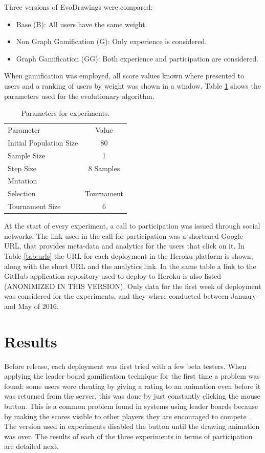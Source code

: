 Three versions of EvoDrawings were compared:
\begin{itemize}
\item Base (B): All users have the same weight.
\item Non Graph Gamification (G): Only experience is considered.
\item Graph Gamification (GG): Both experience and participation are considered.
\end{itemize}
When gamification was employed, all score values known where presented to users
and a ranking of users by weight was shown in a window. Table \ref{tab:params} shows 
the parameters used for the evolutionary algorithm. 

\begin{table}
  \small
  \caption{ Parameters for experiments.  }
  \label{tab:params} 
  \centering
  \small
  \begin{tabular}{l  c}
    \hline\noalign{\smallskip}
     Parameter & Value \\
    \noalign{\smallskip}\hline\noalign{\smallskip}
    Initial Population Size   & 80 \\ \hline
    Sample Size & 1 \\ \hline
    Step Size & 8 Samples \\ \hline
    Mutation &  \\ \hline
    Selection & Tournament \\ \hline
    Tournament Size &  6 \\ \hline
  \end{tabular}
\end{table}

At the start of every experiment, a call to participation was issued
through social networks.  The link used in the call for participation
was a shortened Google URL, that provides meta-data and analytics for the
users that click on it. 
  In Table \ref{tab:urls} the URL for each 
deployment in the Heroku platform is shown,
along with the short URL and the analytics link. In the same table a link to the GitHub 
application repository used to deploy to Heroku is also listed (ANONIMIZED IN THIS VERSION). Only data 
for the first week of deployment was considered for the experiments, and they where conducted 
between January and May of 2016. 

\section{Results}
\label{sec:results} 
Before release, each deployment was first tried with a few beta testers. 
When applying the leader board gamification technique for the first time a 
problem was found: some users were cheating by giving a
rating to an animation even before it was returned from the server, this was done by just
constantly clicking the mouse button. This is a common problem found in systems using leader
boards because by making the scores visible to other players they are encouraged 
to compete \cite{hickman2010total}. The version used in experiments disabled the button until 
the drawing animation was over. The results of each of the three experiments in 
terms of participation are detailed next.

